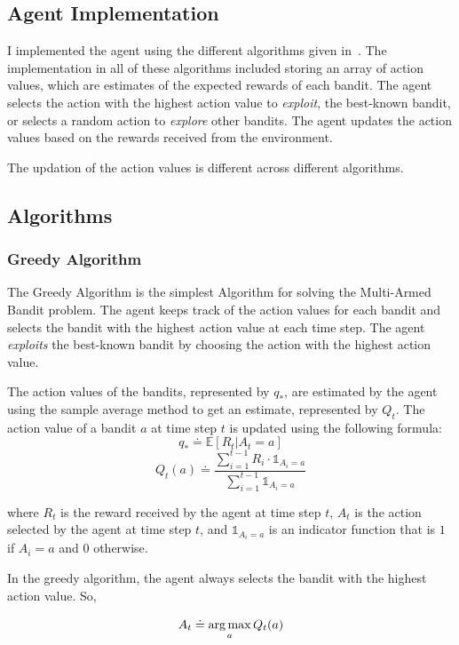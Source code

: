 \subsection{Agent Implementation}

I implemented the agent using the different algorithms given in~\cite{sutton2018reinforcement}. The implementation in all of these algorithms included storing an array of action values, which are estimates of the expected rewards of each bandit. The agent selects the action with the highest action value to \textit{exploit}, the best-known bandit, or selects a random action to \textit{explore} other bandits. The agent updates the action values based on the rewards received from the environment.

The updation of the action values is different across different algorithms.

\subsection{Algorithms}

\subsubsection{Greedy Algorithm}

The Greedy Algorithm is the simplest Algorithm for solving the Multi-Armed Bandit problem. The agent keeps track of the action values for each bandit and selects the bandit with the highest action value at each time step. The agent \textit{exploits} the best-known bandit by choosing the action with the highest action value.

The action values of the bandits, represented by $q_{\ast}$, are estimated by the agent using the sample average method to get an estimate, represented by $Q_t$. The action value of a bandit $a$ at time step $t$ is updated using the following formula:
\[q_\ast\doteq \mathds{E} [R_t|A_t=a]\]
\[Q_t(a)\doteq \frac{\sum_{i=1}^{t-1} R_i \cdot \mathds{1}_{A_i=a}}{\sum_{i=1}^{t-1} \mathds{1}_{A_i=a}}\]

where $R_t$ is the reward received by the agent at time step $t$, $A_t$ is the action selected by the agent at time step $t$, and $\mathds{1}_{A_i=a}$ is an indicator function that is $1$ if $A_i=a$ and $0$ otherwise.

In the greedy algorithm, the agent always selects the bandit with the highest action value. So,

\[A_t \doteq \operatorname*{arg\,max}_{a} Q_t(a)\]


